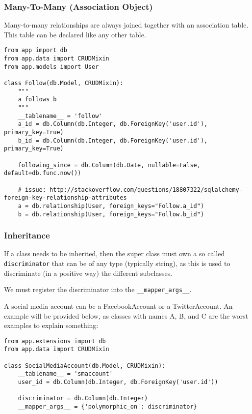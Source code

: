 \documentclass[../main/main.tex]{subfiles}
\begin{document}

\subsubsection{Many-To-Many (Association Object)}
\label{sec:manytomany}

Many-to-many relationships are always joined together with an
association table. This table can be declared like any other table. 


\begin{lstlisting}
from app import db
from app.data import CRUDMixin
from app.models import User

class Follow(db.Model, CRUDMixin):
    """
    a follows b
    """
    __tablename__ = 'follow'
    a_id = db.Column(db.Integer, db.ForeignKey('user.id'), primary_key=True)
    b_id = db.Column(db.Integer, db.ForeignKey('user.id'), primary_key=True)

    following_since = db.Column(db.Date, nullable=False, default=db.func.now())

    # issue: http://stackoverflow.com/questions/18807322/sqlalchemy-foreign-key-relationship-attributes
    a = db.relationship(User, foreign_keys="Follow.a_id")
    b = db.relationship(User, foreign_keys="Follow.b_id")
\end{lstlisting}

\subsubsection{Inheritance}
\label{sec:inheritance}

If a class needs to be inherited, then the super class must own a so called
\lstinline|discriminator| that can be of any type (typically string), as this is
used to discriminate (in a positive way) the different subclasses. 

We must register the discriminator into the \lstinline|__mapper_args__|. 

A social media account can be a FacebookAccount or a TwitterAccount. An example
will be provided below, as classes with names A, B, and C are the worst
examples to explain something: 

\begin{lstlisting}
from app.extensions import db
from app.data import CRUDMixin

class SocialMediaAccount(db.Model, CRUDMixin):
    __tablename__ = 'smaccount'
    user_id = db.Column(db.Integer, db.ForeignKey('user.id'))

    discriminator = db.Column(db.Integer)
    __mapper_args__ = {'polymorphic_on': discriminator}  
\end{lstlisting}
\end{document}
